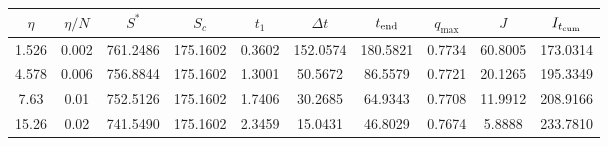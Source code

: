 \begin{tabular}{cccccccccc}
\toprule
$\eta$ & $\eta/N$ & $S^*$ & $S_c$ & $t_1$ & $\Delta t$ & $t_{\rm end}$ & $q_{\max}$ & $J$ & $I_{t_{\rm cum}}$ \\
\midrule
1.526 & 0.002 & 761.2486 & 175.1602 & 0.3602 & 152.0574 & 180.5821 & 0.7734 & 60.8005 & 173.0314 \\
4.578 & 0.006 & 756.8844 & 175.1602 & 1.3001 & 50.5672 & 86.5579 & 0.7721 & 20.1265 & 195.3349 \\
7.63 & 0.01 & 752.5126 & 175.1602 & 1.7406 & 30.2685 & 64.9343 & 0.7708 & 11.9912 & 208.9166 \\
15.26 & 0.02 & 741.5490 & 175.1602 & 2.3459 & 15.0431 & 46.8029 & 0.7674 & 5.8888 & 233.7810 \\
\bottomrule
\end{tabular}
